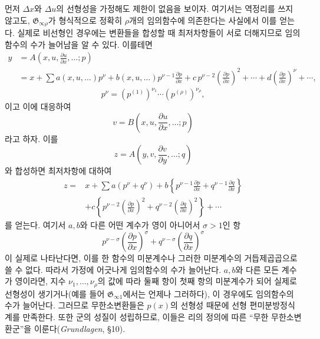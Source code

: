 먼저 \(\Delta x\)와 \(\Delta u\)의 선형성을 가정해도 제한이 없음을 보이자. 여기서는 역정리를 쓰지 않고도, \(\mathfrak G_{\infty\rho}\)가 형식적으로 정확히 \(\rho\)개의 임의함수에 의존한다는 사실에서 이를 얻는다. 실제로 비선형인 경우에는 변환들을 합성할 때 최저차항들이 서로 더해지므로 임의함수의 수가 늘어남을 알 수 있다. 이를테면
\[
\begin{aligned}
y&=A\!\left(x,u,\frac{\partial u}{\partial x},\ldots;p\right)\\
&=x+\sum a(x,u,\ldots)p^\nu
+b(x,u,\ldots)p^{\nu-1}\frac{\partial p}{\partial x}
+c\,p^{\nu-2}\left(\frac{\partial p}{\partial x}\right)^2+\cdots
+d\left(\frac{\partial p}{\partial x}\right)^\nu+\cdots,
\end{aligned}
\]
\[
p^\nu=(p^{(1)})^{\nu_1}\cdots(p^{(\rho)})^{\nu_\rho},
\]
이고 이에 대응하여
\[
v=B\!\left(x,u,\frac{\partial u}{\partial x},\ldots;p\right)
\]
라고 하자. 이를
\[
z=A\!\left(y,v,\frac{\partial v}{\partial y},\ldots;q\right)
\]
와 합성하면 최저차항에 대하여
\[
\begin{aligned}
z={}&x+\sum a(p^\nu+q^\nu)
+b\left\{p^{\nu-1}\frac{\partial p}{\partial x}
+q^{\nu-1}\frac{\partial q}{\partial x}\right\}\\
&+c\left\{p^{\nu-2}\left(\frac{\partial p}{\partial x}\right)^2
+q^{\nu-2}\left(\frac{\partial q}{\partial x}\right)^2\right\}+\cdots
\end{aligned}
\]
를 얻는다. 여기서 \(a,b\)와 다른 어떤 계수가 영이 아니어서 \(\sigma>1\)인 항
\[
p^{\nu-\sigma}\left(\frac{\partial p}{\partial x}\right)^\sigma
+q^{\nu-\sigma}\left(\frac{\partial q}{\partial x}\right)^\sigma
\]
이 실제로 나타난다면, 이를 한 함수의 미분계수나 그러한 미분계수의 거듭제곱곱으로 쓸 수 없다. 따라서 가정에 어긋나게 임의함수의 수가 늘어난다. \(a,b\)와 다른 모든 계수가 영이라면, 지수 \(\nu_1,\ldots,\nu_\rho\)의 값에 따라 둘째 항이 첫째 항의 미분계수가 되어 실제로 선형성이 생기거나(예를 들어 \(\mathfrak G_{\infty1}\)에서는 언제나 그러하다), 이 경우에도 임의함수의 수가 늘어난다. 그러므로 무한소변환들은 \(p(x)\)의 선형성 때문에 선형 편미분방정식계를 만족한다. 또한 군의 성질이 성립하므로, 이들은 리의 정의에 따른 ``무한 무한소변환군''을 이룬다(\emph{Grundlagen}, \S{}10).

